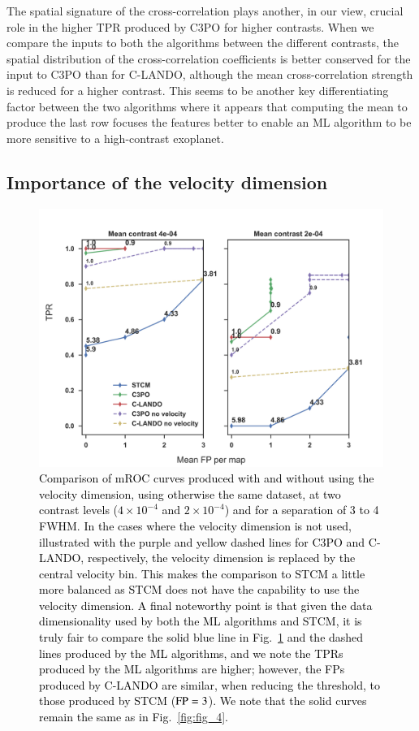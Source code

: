 \documentclass{aa}
\newcommand{\newchange}[1]{\textcolor{black}{#1}}
\begin{document}
The spatial signature of the cross-correlation plays another, in our view, crucial role in the higher TPR produced by C3PO for higher contrasts.
When we compare the inputs to both the algorithms between the different contrasts, the spatial distribution of the cross-correlation coefficients is better conserved for the input to C3PO than for C-LANDO, although the mean cross-correlation strength is reduced for a higher contrast.
This seems to be another key differentiating factor between the two algorithms where it appears that computing the mean to produce the last row focuses the features better to enable an ML algorithm to be more sensitive to a high-contrast exoplanet.
\subsection{Importance of the velocity dimension}
\begin{figure}
    \centering
    \includegraphics[width=\textwidth]{Fig6_April2024_referee_final.png}
    \caption{\newchange{Comparison of mROC curves produced with and without using the velocity dimension, using otherwise the same dataset, at two contrast levels ($4\times 10^{-4}$ and $2\times 10^{-4}$) and for a separation of 3 to 4 FWHM. In the  cases where the velocity dimension is not used, illustrated with the purple and yellow dashed lines for C3PO and C-LANDO, respectively, the velocity dimension is replaced by the central velocity bin. This makes the comparison to STCM a little more balanced as STCM does not have the capability to use the velocity dimension.
A final noteworthy point is that given the data dimensionality used by both the ML algorithms and STCM, it is truly fair to compare the solid blue line in Fig.~\ref{fig:novel_roc} and the dashed lines produced by the ML algorithms, and we note the TPRs produced by the ML algorithms are higher; however, the FPs produced by C-LANDO are similar, when reducing the threshold, to those produced by STCM (${\rm FP}=3$). 
    We note that the solid curves remain the same as in Fig.~\ref{fig:fig_4}.}
    }
    \label{fig:novel_roc}
\end{figure}
\end{document}
